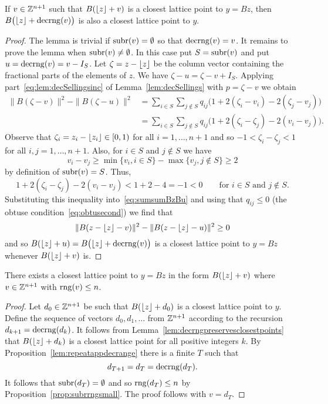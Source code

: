 \documentclass[final,leqno]{siamltex}
\begin{document}
\begin{lemma}\label{lem:decrngpreservesclosestpoints}
If $v \in {\mathbb Z}^{n+1}$ such that $B({\left\lfloor z \right\rfloor} + v)$ is a closest lattice point to $y = Bz$, then $B\big({\left\lfloor z \right\rfloor} + \operatorname{decrng}(v)\big)$ is also a closest lattice point to $y$.
\end{lemma}
\begin{proof}
The lemma is trivial if $\operatorname{subr}(v) = \emptyset$ so that $\operatorname{decrng}(v) = v$.  It remains to prove the lemma when $\operatorname{subr}(v) \neq \emptyset$.  In this case put $S = \operatorname{subr}(v)$ and put $u = \operatorname{decrng}(v) = v - I_S$.  Let $\zeta = z - {\left\lfloor z \right\rfloor}$ be the column vector containing the fractional parts of the elements of $z$.  We have $\zeta - u = \zeta - v + I_S$.  Applying part~\ref{eq:lem:decSellingsinc} of Lemma~\ref{lem:decSellings} with $p = \zeta - v$ we obtain
\begin{align}
\|B(\zeta - v)\|^2 - \|B(\zeta - u)\|^2 &= \sum_{i \in S}\sum_{j \notin S}q_{ij}\big(1 + 2(\zeta_i - v_i)  - 2(\zeta_j - v_j) \big) \nonumber \\
&= \sum_{i \in S}\sum_{j \notin S}q_{ij}\big(1 + 2(\zeta_i-\zeta_j) - 2(v_i - v_j)\big). \label{eq:sumsumBzBu}
\end{align}
Observe that $\zeta_i =  z_i - {\left\lfloor z_i \right\rfloor} \in [0,1)$ for all $i=1,\dots,n+1$ and so $-1 < \zeta_i-\zeta_j < 1$ for all $i,j=1,\dots,n+1$.  Also, for $i \in S$ and $j\notin S$ we have 
\[
v_i - v_j \geq \min\{ v_i, i \in S\} - \max\{v_j, j \notin S\} \geq 2
\]
by definition of $\operatorname{subr}(v) = S$.  Thus,
\[
1 + 2(\zeta_i-\zeta_j) - 2(v_i - v_j) < 1 + 2 - 4 = -1 < 0 \qquad \text{for $i \in S$ and $j \notin S$}.
\]
Substituting this inequality into~\eqref{eq:sumsumBzBu} and using that $q_{ij} \leq 0$ (the obtuse condition~\eqref{eq:obtusecond}) we find that
\[
\|B(z - {\left\lfloor z \right\rfloor} - v)\|^2 - \|B(z - {\left\lfloor z \right\rfloor} - u)\|^2 \geq 0
\]
and so $B({\left\lfloor z \right\rfloor} + u) = B\big({\left\lfloor z \right\rfloor} + \operatorname{decrng}(v)\big)$ is a closest lattice point to $y = Bz$ whenever $B({\left\lfloor z \right\rfloor} + v)$ is.
\end{proof}

\begin{lemma}\label{lem:roundzclose}
There exists a closest lattice point to $y = Bz$ in the form $B({\left\lfloor z \right\rfloor} + v)$ where $v \in {\mathbb Z}^{n+1}$ with $\operatorname{rng}(v) \leq n$.
\end{lemma}
\begin{proof}
Let $d_0 \in {\mathbb Z}^{n+1}$ be such that $B({\left\lfloor z \right\rfloor} + d_0)$ is a closest lattice point to $y$. Define the sequence of vectors $d_0,d_1,\dots$ from ${\mathbb Z}^{n+1}$ according to the recursion $d_{k+1} = \operatorname{decrng}(d_k)$.  It follows from Lemma~\ref{lem:decrngpreservesclosestpoints} that $B({\left\lfloor z \right\rfloor} + d_{k})$ is a closest lattice point for all positive integers $k$.  By Proposition~\ref{lem:repeatappdecrange} there is a finite $T$ such that 
\[
d_{T+1}=d_T=\operatorname{decrng}(d_T).
\]  
It follows that $\operatorname{subr}(d_T) = \emptyset$ and so $\operatorname{rng}(d_T) \leq n$ by Proposition~\ref{prop:subrrngsmall}.  The proof follows with $v = d_T$.   
\end{proof}
\end{document}
